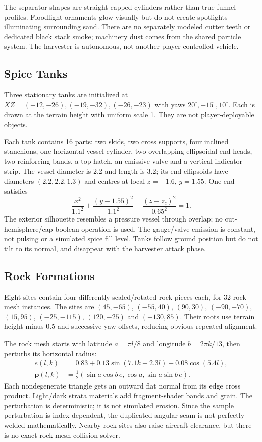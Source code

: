 The separator shapes are straight capped cylinders rather than true funnel profiles. Floodlight ornaments glow visually but do not create spotlights illuminating surrounding sand. There are no separately modeled cutter teeth or dedicated black stack smoke; machinery dust comes from the shared particle system. The harvester is autonomous, not another player-controlled vehicle.

\subsection{Spice Tanks}
Three stationary tanks are initialized at $XZ=(-12,-26),(-19,-32),(-26,-23)$ with yaws $20^\circ,-15^\circ,10^\circ$. Each is drawn at the terrain height with uniform scale 1. They are not player-deployable objects.

Each tank contains 16 parts: two skids, two cross supports, four inclined stanchions, one horizontal vessel cylinder, two overlapping ellipsoidal end heads, two reinforcing bands, a top hatch, an emissive valve and a vertical indicator strip. The vessel diameter is 2.2 and length is 3.2; its end ellipsoids have diameters $(2.2,2.2,1.3)$ and centres at local $z=\pm1.6$, $y=1.55$. One end satisfies
\begin{equation}
\frac{x^2}{1.1^2}+\frac{(y-1.55)^2}{1.1^2}+\frac{(z-z_c)^2}{0.65^2}=1.
\end{equation}
The exterior silhouette resembles a pressure vessel through overlap; no cut-hemisphere/cap boolean operation is used. The gauge/valve emission is constant, not pulsing or a simulated spice fill level. Tanks follow ground position but do not tilt to its normal, and disappear with the harvester attack phase.

\subsection{Rock Formations}
Eight sites contain four differently scaled/rotated rock pieces each, for 32 rock-mesh instances. The sites are $(45,-65)$, $(-55,40)$, $(90,30)$, $(-90,-70)$, $(15,95)$, $(-25,-115)$, $(120,-25)$ and $(-130,85)$. Their roots use terrain height minus 0.5 and successive yaw offsets, reducing obvious repeated alignment.

The rock mesh starts with latitude $a=\pi l/8$ and longitude $b=2\pi k/13$, then perturbs its horizontal radius:
\begin{align}
e(l,k)&=0.83+0.13\sin(7.1k+2.3l)+0.08\cos(5.4l),\\
\mathbf p(l,k)&=\tfrac12(\sin a\cos b\,e,\cos a,\sin a\sin b\,e).
\end{align}
Each nondegenerate triangle gets an outward flat normal from its edge cross product. Light/dark strata materials add fragment-shader bands and grain. The perturbation is deterministic; it is not simulated erosion. Since the sample perturbation is index-dependent, the duplicated angular seam is not perfectly welded mathematically. Nearby rock sites also raise aircraft clearance, but there is no exact rock-mesh collision solver.


